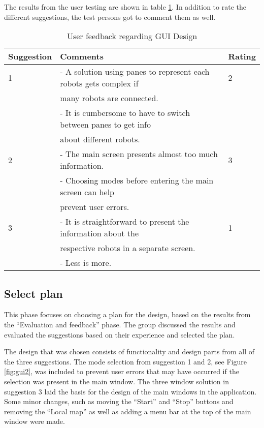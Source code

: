 The results from the user testing are shown in table \ref{tab:guifeedback}. In addition to rate the different suggestions, the test persons got to comment them as well.

\begin{table}[ht]
\begin{center}
\begin{tabular}{|l|l|l|} 
\hline
Suggestion  &   Comments & Rating \\
 \hline
1           &   - A solution using panes to represent each robots gets complex if & 2\\
            &   many robots are connected. & \\
            &   - It is cumbersome to have to switch between panes to get info &\\
            &   about different robots. & \\
\hline
2           &   - The main screen presents almost too much information.  & 3\\
            &   - Choosing modes before entering the main screen can help &\\
            &   prevent user errors.  &\\
\hline
3           &   - It is straightforward to present the information about the & 1\\
            &   respective robots in a separate screen.  &\\
            &   - Less is more.  &\\
\hline
\end{tabular}
\end{center}
\caption{User feedback regarding GUI Design}
\label{tab:guifeedback}
\end{table}


\subsection{Select plan}
\label{sec:selectplan}
This phase focuses on choosing a plan for the design, based on the results from the ``Evaluation and feedback'' phase. The group discussed the results and evaluated the suggestions based on their experience and selected the plan.

The design that was chosen consists of functionality and design parts from all of the three suggestions. The mode selection from suggestion 1 and 2, see Figure \ref{fig:gui2}, was included to prevent user errors that may have occurred if the selection was present in the main window. The three window solution in suggestion 3 laid the basis for the design of the main windows in the application. Some minor changes, such as moving the ``Start'' and ``Stop'' buttons and removing the ``Local map'' as well as adding a menu bar at the top of the main window were made. 